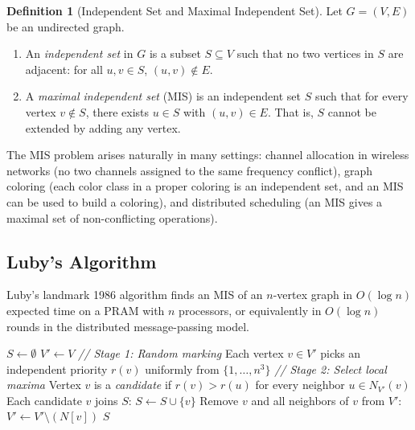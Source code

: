 \documentclass[twoside,12pt]{book}
\theoremstyle{plain}
\theoremstyle{definition}
\newtheorem{definition}[theorem]{Definition}
\theoremstyle{remark}
\begin{document}
\begin{definition}[Independent Set and Maximal Independent Set]
\label{def:mis}
Let $G = (V, E)$ be an undirected graph.
\begin{enumerate}[label=(\roman*)]
\item An \emph{independent set} in $G$ is a subset $S \subseteq V$ such that no two vertices in $S$ are adjacent: for all $u, v \in S$, $(u, v) \notin E$.
\item A \emph{maximal independent set} (MIS) is an independent set $S$ such that for every vertex $v \notin S$, there exists $u \in S$ with $(u, v) \in E$. That is, $S$ cannot be extended by adding any vertex.
\end{enumerate}
\end{definition}

The MIS problem arises naturally in many settings: channel allocation in wireless networks (no two channels assigned to the same frequency conflict), graph coloring (each color class in a proper coloring is an independent set, and an MIS can be used to build a coloring), and distributed scheduling (an MIS gives a maximal set of non-conflicting operations).

\subsection{Luby's Algorithm}
\label{subsec:luby}

Luby's landmark 1986 algorithm finds an MIS of an $n$-vertex graph in $O(\log n)$ expected time on a PRAM with $n$ processors, or equivalently in $O(\log n)$ rounds in the distributed message-passing model.

\begin{algorithm}[H]
\caption{Luby's MIS Algorithm}
\label{alg:luby}
\begin{algorithmic}[1]
\State $S \leftarrow \emptyset$ 
\State $V' \leftarrow V$ 
\State \textit{// Stage 1: Random marking}
\State Each vertex $v \in V'$ picks an independent priority $r(v)$ uniformly from $\{1,\ldots,n^3\}$
\State \textit{// Stage 2: Select local maxima}
\State Vertex $v$ is a \emph{candidate} if $r(v)>r(u)$ for every neighbor $u\in N_{V'}(v)$
\State Each candidate $v$ joins $S$: $S \leftarrow S \cup \{v\}$
\State Remove $v$ and all neighbors of $v$ from $V'$: $V' \leftarrow V' \setminus (N[v])$
\EndWhile
\Return $S$
\EndProcedure
\end{algorithmic}
\end{algorithm}
\end{document}
